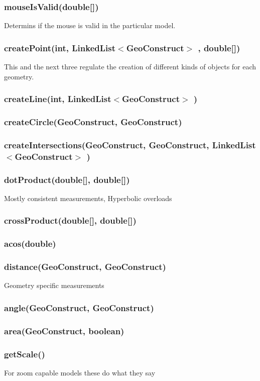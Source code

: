 \documentclass[a4paper,10pt]{report}
\begin{document}
\subsubsection{mouseIsValid(double[])}  Determins if the mouse is valid in the particular model.
\subsubsection{createPoint(int, LinkedList$<$GeoConstruct$>$ , double[])} This and the next three regulate the creation of different kinds of objects for each geometry.
\subsubsection{createLine(int, LinkedList$<$GeoConstruct$>$ )}
\subsubsection{createCircle(GeoConstruct, GeoConstruct)}
\subsubsection{createIntersections(GeoConstruct, GeoConstruct, LinkedList$<$GeoConstruct$>$ )}
\subsubsection{dotProduct(double[], double[])} Mostly consistent measurements, Hyperbolic overloads
\subsubsection{crossProduct(double[], double[])}
\subsubsection{acos(double)}
\subsubsection{distance(GeoConstruct, GeoConstruct)} Geometry specific measurements
\subsubsection{angle(GeoConstruct, GeoConstruct)}
\subsubsection{area(GeoConstruct, boolean)}
\subsubsection{getScale()} For zoom capable models these do what they say
\end{document}
